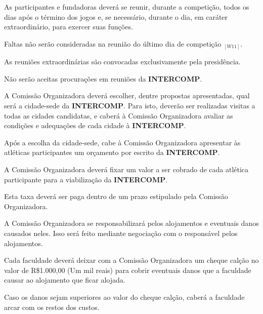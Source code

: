 \begin{article}
	As participantes e fundadoras deverá se reunir, durante a competição, todos os dias após o término dos jogos e, se necessário, durante o dia, em caráter extraordinário, para exercer suas funções.

	\begin{xparagraph}
		Faltas não serão consideradas na reunião do último dia de competição $_{[W11]}$.
	\end{xparagraph}

	\begin{xparagraph}
		As reuniões extraordinárias são convocadas exclusivamente pela presidência.
	\end{xparagraph}
\end{article}

\begin{article}
	Não serão aceitas procurações em reuniões da \textbf{INTERCOMP}.
\end{article}

\begin{article}
	A Comissão Organizadora deverá escolher, dentre propostas apresentadas, qual será a cidade-sede da \textbf{INTERCOMP}. Para isto, deverão ser realizadas visitas a todas as cidades candidatas, e caberá à Comissão Organizadora avaliar as condições e adequações de cada cidade à \textbf{INTERCOMP}.

	\begin{xparagraph}
		Após a escolha da cidade-sede, cabe à Comissão Organizadora apresentar às atléticas participantes um orçamento por escrito da \textbf{INTERCOMP}.
	\end{xparagraph}

	\begin{xparagraph}
		A Comissão Organizadora deverá fixar um valor a ser cobrado de cada atlética participante para a viabilização da \textbf{INTERCOMP}.
	\end{xparagraph}

	\begin{xparagraph}
		Esta taxa deverá ser paga dentro de um prazo estipulado pela Comissão Organizadora.
	\end{xparagraph}

	\begin{xparagraph}
		A Comissão Organizadora se responsabilizará pelos alojamentos e eventuais danos causados neles. Isso será feito mediante negociação com o responsável pelos alojamentos.
	\end{xparagraph}

	\begin{xparagraph}
		Cada faculdade deverá deixar com a Comissão Organizadora um cheque calção no valor de R\$1.000,00 (Um mil reais) para cobrir eventuais danos que a faculdade causar ao alojamento que ficar alojada.
	\end{xparagraph}

	\begin{xparagraph}
		Caso os danos sejam superiores ao valor do cheque calção, caberá a faculdade arcar com os restos dos custos.
	\end{xparagraph}
\end{article}


